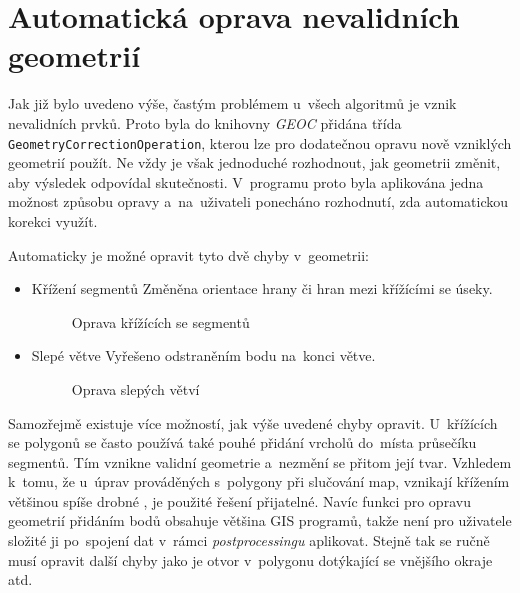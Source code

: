 \section{Automatická oprava nevalidních geometrií}
\label{problemy-opravy}

Jak již bylo uvedeno výše, častým problémem u~všech algoritmů je vznik
nevalidních prvků. Proto byla do knihovny \textit{GEOC} přidána třída
\texttt{Geometry\-Correction\-Operation}, kterou lze pro dodatečnou 
opravu nově vzniklých geometrií použít. Ne vždy je však jednoduché 
rozhodnout, jak geometrii změnit, aby výsledek odpovídal skutečnosti. 
V~programu proto byla aplikována jedna možnost způsobu opravy 
a~na~uživateli ponecháno rozhodnutí, zda automatickou korekci využít.

Automaticky je možné opravit tyto dvě chyby v~geometrii:

\begin{itemize}
 \item Křížení segmentů
	\subitem Změněna orientace hrany či hran mezi křížícími se úseky.
\label{crospic}
  \begin{figure}[hbt]
    \centering
      
      \caption{Oprava křížících se segmentů}
      \label{fig:crossing}
  \end{figure}

 \item Slepé větve
	\subitem Vyřešeno odstraněním bodu na~konci větve.

\label{deadpic}
  \begin{figure}[hbt]
    \centering
      
      \caption{Oprava slepých větví}
      \label{fig:dead-branch}
  \end{figure}
\end{itemize}

Samozřejmě existuje více možností, jak výše uvedené chyby opravit.
U~křížících se polygonů se často používá také pouhé přidání vrcholů
do~místa průsečíku segmentů. Tím vznikne validní geometrie a~nezmění
se přitom její tvar. Vzhledem k~tomu, že u~úprav prováděných 
s~polygony při slučování map, vznikají křížením většinou spíše drobné
, je použité řešení přijatelné. Navíc funkci pro opravu
geometrií přidáním bodů obsahuje většina GIS programů, takže není
pro uživatele složité ji po~spojení dat v~rámci \textit{postprocessingu}
aplikovat. Stejně tak se ručně musí opravit další chyby jako je 
otvor v~polygonu dotýkající se vnějšího okraje atd.
